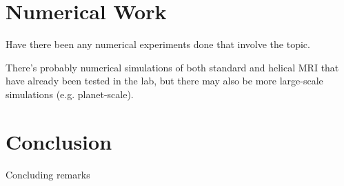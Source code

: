 \documentclass{jfm}
\begin{document}
\section{Numerical Work}
Have there been any numerical experiments done that involve the topic.

There's probably numerical simulations of both standard and helical MRI that
have already been tested in the lab, but there may also be more large-scale
simulations (e.g. planet-scale).



\section{Conclusion}
Concluding remarks





\end{document}
